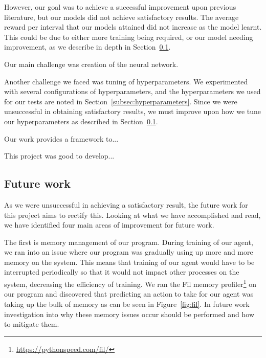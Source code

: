 \documentclass[12pt,a4paper]{article}
\begin{document}

    However, our goal was to achieve a successful improvement upon previous literature, but our models did not achieve satisfactory results.
    The average reward per interval that our models attained did not increase as the model learnt.
    This could be due to either more training being required, or our model needing improvement, as we describe in depth in Section~\ref{subsec:future-work}.

    Our main challenge was creation of the neural network.


    Another challenge we faced was tuning of hyperparameters.
    We experimented with several configurations of hyperparameters, and the hyperparameters we used for our tests are noted in Section~\ref{subsec:hyperparameters}.
    Since we were unsuccessful in obtaining satisfactory results, we must improve upon how we tune our hyperparameters as described in Section~\ref{subsec:future-work}.

    Our work provides a framework to...

    This project was good to develop...


    
    \subsection{Future work}\label{subsec:future-work}
    As we were unsuccessful in achieving a satisfactory result, the future work for this project aims to rectify this.
    Looking at what we have accomplished and read, we have identified four main areas of improvement for future work.

    The first is memory management of our program.
    During training of our agent, we ran into an issue where our program was gradually using up more and more memory on the system.
    This means that training of our agent would have to be interrupted periodically so that it would not impact other processes on the system, decreasing the efficiency of training.
    We ran the Fil memory profiler\footnote{\url{https://pythonspeed.com/fil/}} on our program and discovered that predicting an action to take for our agent was taking up the bulk of memory as can be seen in Figure~\ref{fig:fil}.
    In future work investigation into why these memory issues occur should be performed and how to mitigate them.
\end{document}

